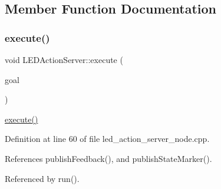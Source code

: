 \subsection{Member Function Documentation}
\mbox{\label{classLEDActionServer_a2d8b9dfca1912e24170ef69a5edf5e9b}} 
\subsubsection{\texorpdfstring{execute()}{execute()}\hspace{0.1cm}{\footnotesize\ttfamily [1/2]}}
{\footnotesize\ttfamily void L\+E\+D\+Action\+Server\+::execute (\begin{DoxyParamCaption}\item[{const sm\+\_\+dance\+\_\+bot\+::\+L\+E\+D\+Control\+Goal\+Const\+Ptr \&}]{goal }\end{DoxyParamCaption})\hspace{0.3cm}{\ttfamily [inline]}}

\hyperlink{classLEDActionServer_a2d8b9dfca1912e24170ef69a5edf5e9b}{execute()} 

Definition at line 60 of file led\+\_\+action\+\_\+server\+\_\+node.\+cpp.



References publish\+Feedback(), and publish\+State\+Marker().



Referenced by run().


